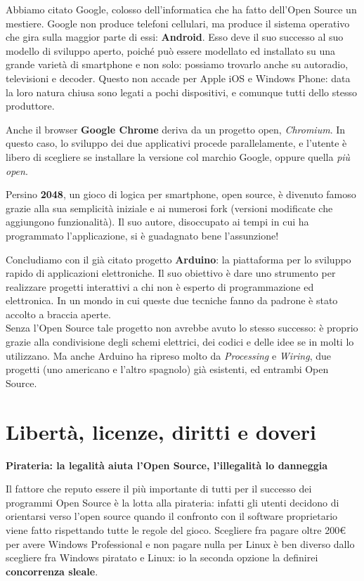 \documentclass[a4paper, 12pt]{extarticle}
\begin{document}
Abbiamo citato Google, colosso dell'informatica che ha fatto dell'Open
Source un mestiere.
Google non produce telefoni cellulari, ma produce il
sistema operativo che gira sulla maggior parte di essi:
\textbf{Android}. Esso deve il suo successo al suo modello di sviluppo
aperto, poiché può essere modellato ed installato su una grande varietà
di smartphone e non solo: possiamo trovarlo anche su autoradio,
televisioni e decoder. Questo non accade per Apple iOS e Windows Phone:
data la loro natura chiusa sono legati a pochi dispositivi, e comunque
tutti dello stesso produttore.

Anche il browser \textbf{Google Chrome} deriva da un progetto open,
\textit{Chromium}. In questo caso, lo sviluppo dei due applicativi
procede parallelamente, e l'utente è libero di scegliere se installare
la versione col marchio Google, oppure quella \textit{più open}.

Persino \textbf{2048}, un gioco di logica per smartphone, open source, è
divenuto famoso grazie alla sua semplicità iniziale e ai numerosi fork
(versioni modificate che aggiungono funzionalità).
Il suo autore, disoccupato ai tempi in cui ha programmato l'applicazione,
si è guadagnato bene l'assunzione!

Concludiamo con il già citato progetto \textbf{Arduino}: la piattaforma
per lo sviluppo rapido di applicazioni elettroniche.
Il suo obiettivo è dare uno strumento per realizzare progetti interattivi
a chi non è esperto di programmazione ed elettronica.
In un mondo in cui queste due tecniche fanno da padrone
è stato accolto a braccia aperte.\\
Senza l'Open Source tale progetto non avrebbe avuto lo stesso successo:
è proprio grazie alla condivisione degli schemi elettrici, dei codici e
delle idee se in molti lo utilizzano.
Ma anche Arduino ha ripreso molto da \textit{Processing} e
\textit{Wiring}, due progetti (uno americano e l'altro spagnolo)
già esistenti, ed entrambi Open Source.

\clearpage

\section*{Libertà, licenze, diritti e doveri}

\textbf{Pirateria: la legalità aiuta l'Open Source, l'illegalità lo danneggia}

Il fattore che reputo essere il più importante di tutti per il successo
dei programmi Open Source è la lotta alla pirateria: infatti gli utenti
decidono di orientarsi verso l'open source quando il confronto con il
software proprietario viene fatto rispettando tutte le regole del
gioco. Scegliere fra pagare oltre 200\euro{} per avere Windows Professional
e non pagare nulla per Linux è ben diverso dallo scegliere fra Windows
piratato e Linux: io la seconda opzione la definirei
\textbf{concorrenza sleale}.
\end{document}
